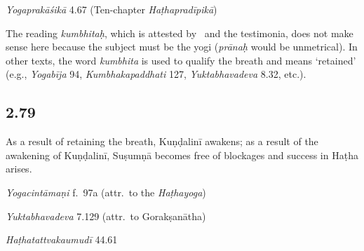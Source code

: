 \begin{ekdosis}
\begin{testimonia}[hp02_078]
\emph{Yogaprakāśikā} 4.67 (Ten-chapter \emph{Haṭhapradīpikā})

\begin{versinnote}
\end{versinnote}
\end{testimonia}

\begin{philcomm}[hp02_078]
The reading \emph{kumbhitaḥ}, which is attested by \alphaOne\ and the testimonia, does not make sense here because the subject must be the yogi (\emph{prānaḥ} would be unmetrical). In other texts, the word \emph{kumbhita} is used to qualify the breath and means `retained' (e.g., \emph{Yogabīja} 94, \emph{Kumbhakapaddhati} 127, \emph{Yuktabhavadeva} 8.32, etc.).
\end{philcomm}

\subsection*{2.79}
\begin{translation}[hp02_079]
As a result of retaining the breath, Kuṇḍalinī awakens; as a result of the awakening of Kuṇḍalinī, Suṣumṇā becomes free of blockages and success in Haṭha arises.
\end{translation}

\begin{testimonia}[hp02_079]
\emph{Yogacintāmaṇi} f.~97a (attr.~to the \emph{Haṭhayoga})

\begin{versinnote}
\tl{\var{anargalaḥ ] L, antargataḥ N}\\!}
\end{versinnote}

\emph{Yuktabhavadeva} 7.129 (attr.~to Gorakṣanātha)

\begin{versinnote}
\end{versinnote}

\emph{Haṭhatattvakaumudī} 44.61


\end{testimonia}
\end{ekdosis}

